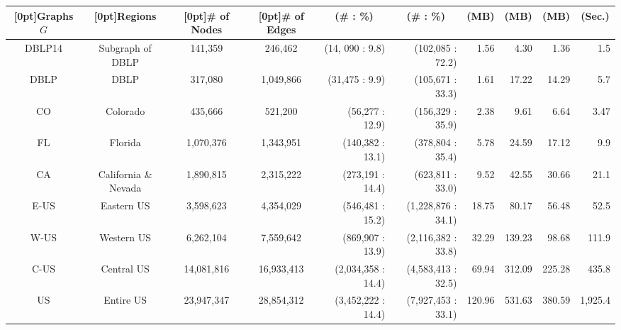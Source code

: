 \begin{table}[t!]
\begin{center}
\begin{scriptsize}
\begin{tabular}{|c||c|c|c||r|r|r|r|r|r|}
  \raisebox{1.5ex}[0pt]{\bf Graphs $G$} &   \raisebox{1.5ex}[0pt]{\bf Regions} &   \raisebox{1.5ex}[0pt]{\bf \# of Nodes} &   \raisebox{1.5ex}[0pt]{\bf \# of Edges} & \multicolumn{1}{c|}{\bf (\# : \%)}  &  \multicolumn{1}{c|}{\bf (\# : \%)}  & \multicolumn{1}{c|}{\bf (MB)} & \multicolumn{1}{c|}{\bf (MB)} & \multicolumn{1}{c|}{\bf (MB)} & \multicolumn{1}{c|}{\bf (Sec.)}\\
\hline\hline
DBLP14      &   Subgraph of DBLP          & 141,359  &   246,462     &  (14, 090 : 9.8)         & (102,085 : 72.2)  & 1.56 & 4.30 & 1.36 &  1.5 \\ \hline
DBLP        & DBLP                        & 317,080 & 1,049,866     & (31,475 : 9.9)             & (105,671 : 33.3) & 1.61 & 17.22 & 14.29  & 5.7 \\ \hline
CO          &  Colorado              & 435,666      &  521,200       &  (56,277 : 12.9)         & (156,329 : 35.9)  & 2.38  & 9.61 & 6.64 & 3.47  \\ \hline
FL          &  Florida               & 1,070,376    &  1,343,951      &  (140,382 : 13.1)        & (378,804 : 35.4)  & 5.78  & 24.59 & 17.12 &  9.9 \\ \hline
CA          &  California \& Nevada   & 1,890,815   &  2,315,222      &  (273,191 : 14.4)        & (623,811 : 33.0)  & 9.52  & 42.55 & 30.66 & 21.1 \\ \hline
E-US        &  Eastern US            & 3,598,623    &  4,354,029    &  (546,481 : 15.2)        & (1,228,876 : 34.1)& 18.75  & 80.17 & 56.48 &  52.5  \\ \hline
W-US        &  Western US            & 6,262,104    &  7,559,642      &  (869,907 : 13.9)        & (2,116,382 : 33.8)& 32.29  & 139.23 & 98.68 &  111.9 \\ \hline
C-US        &  Central US            & 14,081,816   &  16,933,413    &  (2,034,358 : 14.4)      & (4,583,413 : 32.5)& 69.94 & 312.09 & 225.28 & 435.8 \\ \hline
US          &  Entire US             & 23,947,347   &  28,854,312      &  (3,452,222 : 14.4)      & (7,927,453 : 33.1)& 120.96 & 531.63 & 380.59 &  1,925.4 \\ \hline
\end{tabular}
\end{scriptsize}
\end{center}
\vspace{-3ex}
\end{table}





